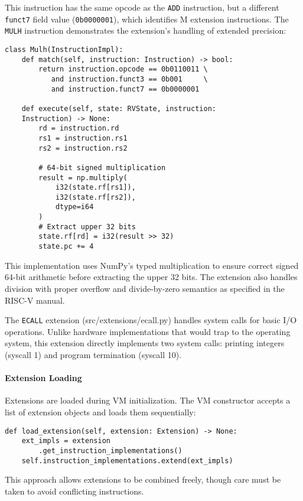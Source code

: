 \documentclass[sigconf]{acmart}
\begin{document}
This instruction has the same opcode as the \texttt{ADD} instruction, but a different \texttt{funct7} field value (\texttt{0b0000001}), which identifies M extension instructions. The \texttt{MULH} instruction demonstrates the extension's handling of extended precision:

\begin{verbatim}
class Mulh(InstructionImpl):
    def match(self, instruction: Instruction) -> bool:
        return instruction.opcode == 0b0110011 \
           and instruction.funct3 == 0b001     \
           and instruction.funct7 == 0b0000001
    
    def execute(self, state: RVState, instruction: 
    Instruction) -> None:
        rd = instruction.rd
        rs1 = instruction.rs1
        rs2 = instruction.rs2
        
        # 64-bit signed multiplication
        result = np.multiply(
            i32(state.rf[rs1]), 
            i32(state.rf[rs2]), 
            dtype=i64
        )
        # Extract upper 32 bits
        state.rf[rd] = i32(result >> 32)
        state.pc += 4
\end{verbatim}

This implementation uses NumPy's typed multiplication to ensure correct signed 64-bit arithmetic before extracting the upper 32 bits. The extension also handles division with proper overflow and divide-by-zero semantics as specified in the RISC-V manual.

The \texttt{ECALL} extension (src/extensions/ecall.py) handles system calls for basic I/O operations. Unlike hardware implementations that would trap to the operating system, this extension directly implements two system calls: printing integers (syscall 1) and program termination (syscall 10).

\paragraph{Extension Loading}
Extensions are loaded during VM initialization. The VM constructor accepts a list of extension objects and loads them sequentially:
\begin{verbatim}
def load_extension(self, extension: Extension) -> None:
    ext_impls = extension
        .get_instruction_implementations()
    self.instruction_implementations.extend(ext_impls)
\end{verbatim}
This approach allows extensions to be combined freely, though care must be taken to avoid conflicting instructions.
\end{document}
